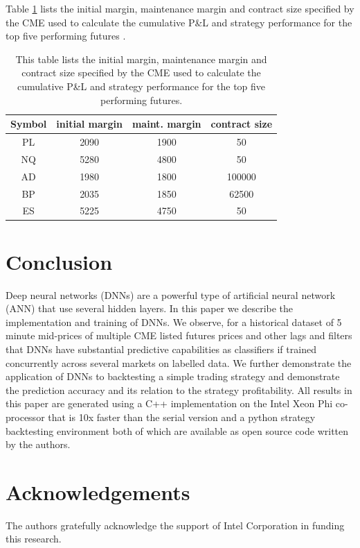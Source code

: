 \documentclass{article}
\begin{document}
\vspace{30pt}

Table \ref{tab:margin} lists the initial margin, maintenance margin and contract size specified by the CME used to calculate the cumulative P\&L and strategy performance for the top five performing futures .


\begin{table}[H]
\begin{center}
\begin{tabular}{|c|c|c|c|}
\hline
Symbol &	initial margin &	maint. margin & contract size\\
\hline
PL	& 2090	&1900	&50\\
NQ	 & 5280	& 4800	& 50\\
AD	& 1980 &	1800	&100000\\
BP&	2035	 & 1850 &	62500\\
ES&	5225	& 4750&	50\\
\hline
\end{tabular}
\end{center}
\caption{This table lists the initial margin, maintenance margin and contract size specified by the CME  used to calculate the cumulative P\&L and strategy performance for the top five performing futures.}
\label{tab:margin}
\end{table}



\section{Conclusion}
Deep neural networks (DNNs) are a powerful type of artificial neural network (ANN) that use several hidden layers. In this paper we describe the implementation and training of DNNs. We observe, for a historical dataset of 5 minute
mid-prices of multiple CME listed futures prices and other lags and filters that DNNs have substantial predictive capabilities as classifiers if trained concurrently across several markets on labelled data.  We further demonstrate the application of DNNs to backtesting a simple trading strategy and demonstrate the prediction accuracy and its relation to the strategy profitability. All results in this paper are generated using a C++ implementation on the Intel Xeon Phi co-processor that is 10x faster than the serial version and a python strategy backtesting environment both of which are available as open source code written by the authors.

\section{Acknowledgements} The authors gratefully acknowledge the support of Intel
Corporation in funding this research.

\clearpage

 
\end{document}

